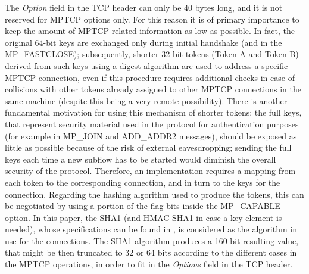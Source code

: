 The \textit{Option} field in the TCP header can only be 40 bytes long, and it is not reserved for MPTCP options only. For this reason it is of primary importance to keep the amount of MPTCP related information as low as possible. In fact, the original 64-bit keys are exchanged only during initial handshake (and in the MP\_FASTCLOSE); subsequently, shorter 32-bit tokens (Token-A and Token-B) derived from such keys using a digest algorithm are used to address a specific MPTCP connection, even if this procedure requires additional checks in case of collisions with other tokens already assigned to other MPTCP connections in the same machine (despite this being a very remote possibility). There is another fundamental motivation for using this mechanism of shorter tokens: the full keys, that represent security material used in the protocol for authentication purposes (for example in MP\_JOIN and ADD\_ADDR2 messages), should be exposed as little as possible because of the risk of external eavesdropping; sending the full keys each time a new subflow has to be started would diminish the overall security of the protocol. Therefore, an implementation requires a mapping from each token to the corresponding connection, and in turn to the keys for the connection.
Regarding the hashing algorithm used to produce the tokens, this can be negotiated by using a portion of the flag bits inside the MP\_CAPABLE option. In this paper, the SHA1 (and HMAC-SHA1 in case a key element is needed), whose specifications can be found in , is considered as the algorithm in use for the connections. The SHA1 algorithm produces a 160-bit resulting value, that might be then truncated to 32 or 64 bits according to the different cases in the MPTCP operations, in order to fit in the \textit{Options} field in the TCP header.


